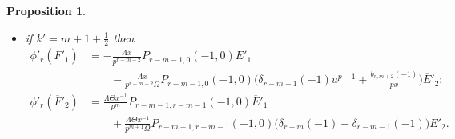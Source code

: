 \documentclass[11pt]{amsart}
\theoremstyle{definition}
\numberwithin{equation}{subsection}
\theoremstyle{plain}
\theoremstyle{plain}
\theoremstyle{plain}
\theoremstyle{plain}
\theoremstyle{plain}
\theoremstyle{plain}
\theoremstyle{plain}
\theoremstyle{plain}
\newtheorem{prop}[equation]{Proposition}
\theoremstyle{plain}
\theoremstyle{plain}
\theoremstyle{plain}
\theoremstyle{plain}
\theoremstyle{definition}
\theoremstyle{definition}
\theoremstyle{definition}
\theoremstyle{remark}
\renewcommand{\(}{\textup{(}}
\renewcommand{\)}{\textup{)}}
\newcommand{\barE}{\overline{E}}
\newcommand{\barF}{\overline{F}}
\begin{document}
\begin{prop}
\begin{itemize}[leftmargin=*]
\begin{align*}
     &\hspace{3em}
     +\frac{\Lambda\Theta x^{-1}}{p^m\Omega} P_{r-m-1,r-m-1}(-1,0)\dot{\delta}_{r-m}(-1)u^{p-1}\barE'_2,
    \end{align*}
\item if $k'=m+1+\frac{1}{2}$ then
    \begin{align*}
    \phi'_r(\barF'_1) &=-\frac{\Lambda x}{p^{r-m-2}}P_{r-m-1,0}(-1,0)\barE'_1\\
    &\hspace{2em}
    -\frac{\Lambda x}{p^{r-m-2}\Omega} P_{r-m-1,0}(-1,0)\Big(\dot{\delta}_{r-m-1}(-1)u^{p-1}+\frac{b_{r,m+2}(-1)}{px}\Big)\barE'_2;\\
    \phi'_r(\barF'_2) &=
        \frac{\Lambda \Theta x^{-1}}{p^m}P_{r-m-1,r-m-1}(-1,0)\barE'_1\\
        &\hspace{2em}
        +\frac{\Lambda\Theta x^{-1}}{p^{m+1}\Omega} P_{r-m-1,r-m-1}(-1,0)\big(
        \delta_{r-m}(-1)-\delta_{r-m-1}(-1)
        \big)\barE'_2.
    \end{align*}
\end{itemize}
\end{prop}
\end{document}
